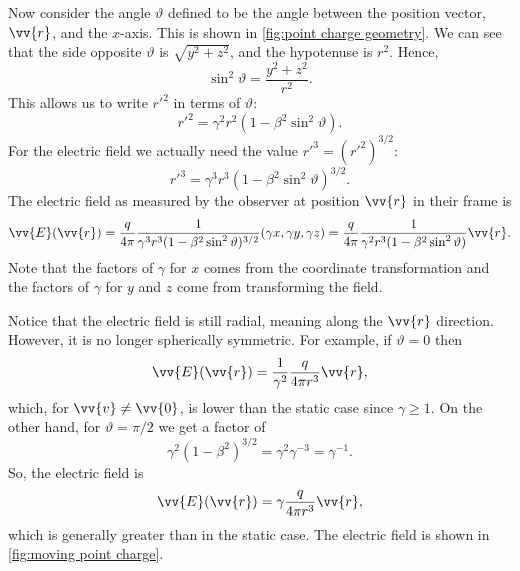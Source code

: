 Now consider the angle \(\vartheta\) defined to be the angle between the position vector, \(\vv{r}\), and the \(x\)-axis.
This is shown in \cref{fig:point charge geometry}.
We can see that the side opposite \(\vartheta\) is \(\sqrt{y^2 + z^2}\), and the hypotenuse is \(r^2\).
Hence,
\begin{equation}
    \sin^2\vartheta = \frac{y^2 + z^2}{r^2}.
\end{equation}
This allows us to write \(r'^2\) in terms of \(\vartheta\):
\begin{equation}
    r'^2  = \gamma^2r^2(1 - \beta^2\sin^2\vartheta).
\end{equation}
For the electric field we actually need the value \(r'^3 = (r'^2)^{3/2}\):
\begin{equation}
    r'^3 = \gamma^3r^3(1 - \beta^2\sin^2\vartheta)^{3/2}.
\end{equation}
The electric field as measured by the observer at position \(\vv{r}\) in their frame is
\begin{equation}
    \vv{E}(\vv{r}) = \frac{q}{4\pi} \frac{1}{\gamma^3r^3(1 - \beta^2\sin^2\vartheta)^{3/2}}(\gamma x, \gamma y, \gamma z) = \frac{q}{4\pi} \frac{1}{\gamma^2r^3(1 - \beta^2\sin^2\vartheta)}\vv{r}.
\end{equation}
Note that the factors of \(\gamma\) for \(x\) comes from the coordinate transformation and the factors of \(\gamma\) for \(y\) and \(z\) come from transforming the field.

Notice that the electric field is still radial, meaning along the \(\vv{r}\) direction.
However, it is no longer spherically symmetric.
For example, if \(\vartheta = 0\) then
\begin{equation}
    \vv{E}(\vv{r}) = \frac{1}{\gamma^2}\frac{q}{4\pi r^3}\vv{r},
\end{equation}
which, for \(\vv{v} \ne \vv{0}\), is lower than the static case since \(\gamma \ge 1\).
On the other hand, for \(\vartheta = \pi/2\) we get a factor of
\begin{equation}
    \gamma^2(1 - \beta^2)^{3/2} = \gamma^2 \gamma^{-3} = \gamma^{-1}.
\end{equation}
So, the electric field is
\begin{equation}
    \vv{E}(\vv{r}) = \gamma\frac{q}{4\pi r^3}\vv{r},
\end{equation}
which is generally greater than in the static case.
The electric field is shown in \cref{fig:moving point charge}.

